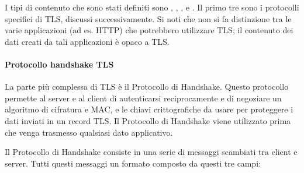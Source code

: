 \documentclass{article}
\theoremstyle{definition}
\begin{document}
I tipi di contenuto che sono stati definiti sono , , , e . Il primo tre sono i protocolli specifici di TLS, discussi successivamente. Si noti che non si fa distinzione tra le varie applicazioni (ad es. HTTP) che potrebbero utilizzare TLS; il contenuto dei dati creati da tali applicazioni è opaco a TLS.

\paragraph{Protocollo handshake TLS} %
La parte più complessa di TLS è il Protocollo di Handshake. Questo protocollo permette al server e al client di autenticarsi reciprocamente e di negoziare un algoritmo di cifratura e MAC, e le chiavi crittografiche da usare per proteggere i dati inviati in un record TLS. Il Protocollo di Handshake viene utilizzato prima che venga trasmesso qualsiasi dato applicativo.

Il Protocollo di Handshake consiste in una serie di messaggi scambiati tra client e server. Tutti questi messaggi un formato composto da questi tre campi:
\end{document}
